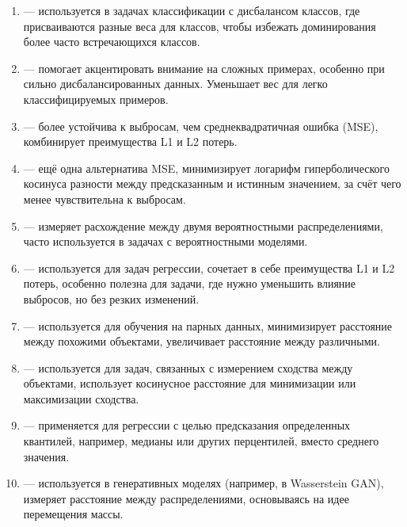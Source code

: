 \begin{enumerate}
    \item {} — используется в задачах классификации с дисбалансом классов, где присваиваются разные веса для классов, чтобы избежать доминирования более часто встречающихся классов.
    
    \item {} — помогает акцентировать внимание на сложных примерах, особенно при сильно дисбалансированных данных. Уменьшает вес для легко классифицируемых примеров.
    
    \item {} — более устойчива к выбросам, чем среднеквадратичная ошибка (MSE), комбинирует преимущества L1 и L2 потерь.
    
    \item {} — ещё одна альтернатива MSE, минимизирует логарифм гиперболического косинуса разности между предсказанным и истинным значением, за счёт чего менее чувствительна к выбросам.
    
    \item {} — измеряет расхождение между двумя вероятностными распределениями, часто используется в задачах с вероятностными моделями.
    
    \item {} — используется для задач регрессии, сочетает в себе преимущества L1 и L2 потерь, особенно полезна для задачи, где нужно уменьшить влияние выбросов, но без резких изменений.
    
    \item {} — используется для обучения на парных данных, минимизирует расстояние между похожими объектами, увеличивает расстояние между различными.
    
    \item {} — используется для задач, связанных с измерением сходства между объектами, использует косинусное расстояние для минимизации или максимизации сходства.
    
    \item {} — применяется для регрессии с целью предсказания определенных квантилей, например, медианы или других перцентилей, вместо среднего значения.
    
    \item {} — используется в генеративных моделях (например, в Wasserstein GAN), измеряет расстояние между распределениями, основываясь на идее перемещения массы.
    

\end{enumerate}
